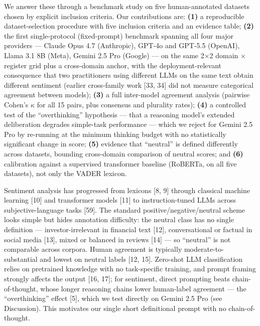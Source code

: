 \documentclass[11pt]{article}
\begin{document}
We answer these through a benchmark study on five human-annotated
datasets chosen by explicit inclusion criteria. Our contributions are:
\textbf{(1)} a reproducible dataset-selection procedure with five
inclusion criteria and an evidence table; \textbf{(2)} the first
single-protocol (fixed-prompt) benchmark spanning all four major
providers --- Claude Opus 4.7 (Anthropic), GPT-4o and GPT-5.5 (OpenAI),
Llama 3.1 8B (Meta), Gemini 2.5 Pro (Google) --- on the same 2$\times$2 domain
$\times$ register grid plus a cross-domain anchor, with the deployment-relevant
consequence that two practitioners using different LLMs on the same text
obtain different sentiment (earlier cross-family work {[}33, 34{]} did
not measure categorical agreement between models); \textbf{(3)} a full
inter-model agreement analysis (pairwise Cohen's $\kappa$ for all 15 pairs,
plus consensus and plurality rates); \textbf{(4)} a controlled test of
the ``overthinking'' hypothesis --- that a reasoning model's extended
deliberation degrades simple-task performance --- which we reject for
Gemini 2.5 Pro by re-running at the minimum thinking budget with no
statistically significant change in score; \textbf{(5)} evidence that
``neutral'' is defined differently across datasets, bounding
cross-domain comparison of neutral scores; and \textbf{(6)} calibration
against a supervised transformer baseline (RoBERTa, on all five
datasets), not only the VADER lexicon.

Sentiment analysis has progressed from lexicons {[}8, 9{]} through
classical machine learning {[}10{]} and transformer models {[}11{]} to
instruction-tuned LLMs across subjective-language tasks {[}59{]}. The
standard positive/negative/neutral scheme looks simple but hides
annotation difficulty: the neutral class has no single definition ---
investor-irrelevant in financial text {[}12{]}, conversational or
factual in social media {[}13{]}, mixed or balanced in reviews {[}14{]}
--- so ``neutral'' is not comparable across corpora. Human agreement is
typically moderate-to-substantial and lowest on neutral labels {[}12,
15{]}. Zero-shot LLM classification relies on pretrained knowledge with
no task-specific training, and prompt framing strongly affects the
output {[}16, 17{]}; for sentiment, direct prompting beats
chain-of-thought, whose longer reasoning chains lower human-label
agreement --- the ``overthinking'' effect {[}5{]}, which we test
directly on Gemini 2.5 Pro (see Discussion). This motivates our single
short definitional prompt with no chain-of-thought.
\end{document}
